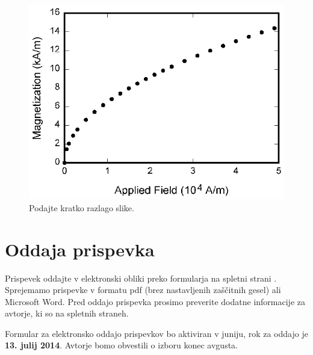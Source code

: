 \documentclass[a4paper]{article}
\begin{document}
\begin{figure}[!htb]
    \begin{center}
        \includegraphics[scale=1]{field1.eps}
        \caption{Podajte kratko razlago slike.} \label{slika}
    \end{center}
\end{figure}

\section{Oddaja prispevka}

Prispevek oddajte v elektronski obliki preko formularja na spletni strani \cite{ERK}. Sprejemamo prispevke v formatu pdf (brez nastavljenih zaščitnih gesel) ali Microsoft Word. Pred oddajo prispevka prosimo preverite dodatne informacije za avtorje, ki so na spletnih straneh. 

Formular za elektronsko oddajo prispevkov bo aktiviran v juniju, rok za oddajo je \textbf{13. julij 2014}. Avtorje bomo obvestili o izboru konec avgusta.
\end{document}
